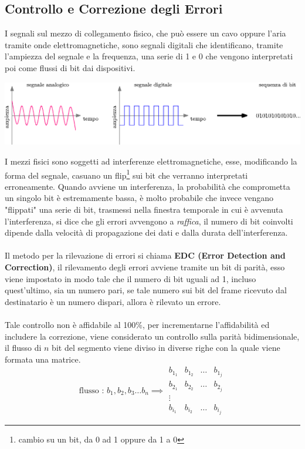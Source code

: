 \documentclass[12pt, letterpaper]{article}
\newcommand{\acc}{\\\hphantom{}\\}
\begin{document}
\subsection{Controllo e Correzione degli Errori}
I segnali sul mezzo di collegamento fisico, che può essere un cavo oppure l'aria tramite onde elettromagnetiche, sono 
segnali digitali che identificano, tramite l'ampiezza del segnale e la frequenza, una serie di 1 e 0 che vengono interpretati 
poi come flussi di bit dai dispositivi.\begin{center}
    \includegraphics[width=\textwidth ]{images/segnali.eps}
\end{center} 
I mezzi fisici sono soggetti ad interferenze elettromagnetiche, esse, modificando la forma del segnale, casuano 
un flip\footnote{cambio su un bit, da 0 ad 1 oppure da 1 a 0} sui bit che verranno interpretati erroneamente. Quando avviene 
un interferenza, la probabilità che comprometta un singolo bit è estremamente bassa, è molto probabile che invece vengano 
"flippati" una serie di bit, trasmessi nella finestra temporale in cui è avvenuta l'interferenza, si dice che 
gli errori avvengono a \textit{raffica}, il numero di bit coinvolti dipende dalla velocità di propagazione dei dati 
e dalla durata dell'interferenza.\acc 
Il metodo per la rilevazione di errori si chiama \textbf{EDC (Error Detection and Correction)}, il rilevamento degli 
errori avviene tramite un bit di parità, esso viene impostato in modo tale che il numero di bit uguali ad 1, incluso quest'ultimo, 
sia un numero pari, se tale numero sui bit del frame ricevuto dal destinatario è un numero dispari, allora è rilevato un 
errore.\acc 
Tale controllo non è affidabile al 100\%, per incrementarne l'affidabilità ed includere la correzione, viene considerato un 
controllo sulla parità bidimensionale, il flusso di $n$ bit del segmento viene diviso in diverse righe con la quale 
viene formata una matrice.
$$\text{flusso : }b_1,b_2,b_3\dots b_n \implies \begin{matrix}
    b_{1_1}&b_{1_2}&\dots &b_{1_j}\\ 
    b_{2_1}&b_{2_2}&\dots &b_{2_j}\\
    \vdots \\ 
    b_{i_1}&b_{i_2}&\dots &b_{i_j}
\end{matrix} $$
\end{document}
